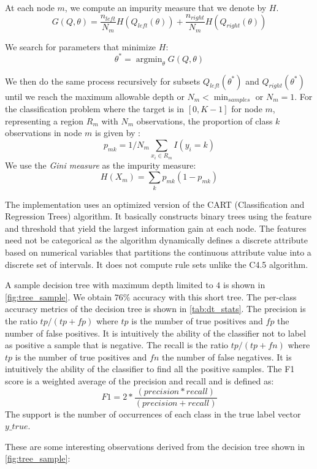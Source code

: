 At each node $m$, we compute an impurity measure that we denote by $H$.
$$G(Q,\theta) = \frac{n_{left}}{N_m} H(Q_{left}(\theta)) +
\frac{n_{right}}{N_m} H(Q_{right}(\theta))$$

We search for parameters that minimize $H$:
$$\theta^* = \operatorname{argmin}_\theta G(Q,\theta)$$

We then do the same process recursively for subsets $Q_{left}(\theta^*)$ and
$Q_{right}(\theta^*)$ until we reach the maximum allowable depth or $N_m
< \min_{samples}$ or $N_m = 1$.
For the classification problem where the target is in $[ 0, K-1]$
for node $m$, representing a region $R_m$ with $N_m$ observations,
the proportion of class $k$ observations in node $m$ is given by :
$$p_{mk} = 1/ N_m \sum_{x_i \in R_m} I(y_i = k)$$
We use the \textit{Gini measure} as the impurity measure:
$$H(X_m) = \sum_k p_{mk} (1 - p_{mk})$$

The implementation uses an optimized version of the CART (Classification and
Regression Trees) algorithm\citep{cart84}.
It basically constructs binary trees using the feature and threshold that
yield the largest information gain at each node.
The features need not be categorical as the algorithm dynamically
defines a discrete attribute based on numerical variables that
partitions the continuous attribute value into a discrete set of intervals.
It does not compute rule sets unlike the C4.5 algorithm\citep{quinlan93}.

A sample decision tree with maximum depth limited to $4$ is shown in
\cref{fig:tree_sample}. We obtain $76\%$ accuracy with this short tree.
The per-class accuracy metrics of the decision tree is shown in
\cref{tab:dt_stats}.
The precision is the ratio $tp/(tp+fp)$ where $tp$ is the number of true
positives and $fp$ the number of false positives.
It is intuitively the ability of the classifier not to label
as positive a sample that is negative.
The recall is the ratio $tp/(tp+fn)$ where $tp$ is the number of true
positives and $fn$ the number of false negatives. It is intuitively the
ability of the classifier to find all the positive samples.
The F1 score is a weighted average of the precision and recall
and is defined as:
$$F1 = 2 * \frac{(precision * recall)}{(precision + recall)}$$
The support is the number of occurrences of each class in the true label
vector $y\_true$.

These are some interesting observations derived from the decision tree shown in
\cref{fig:tree_sample}:\\

